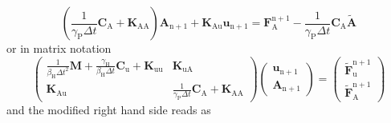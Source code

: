 \begin{equation}
\left(\frac{1}{\gamma_\mathrm{P} \Delta t} \mathbf{C}_\mathrm{A} +  \mathbf{K}_\mathrm{AA}\right) \mathbf{A}_{\mathrm{n}+1} 
+ \mathbf{K}_\mathrm{Au} \mathbf{u}_{\mathrm{n} + 1} = 
 \mathbf{F}_{\mathrm{A}}^{\mathrm{n}+1} - \frac{1}{\gamma_\mathrm{P} \Delta t} \mathbf{C}_\mathrm{A} \mathbf{\tilde{A}}
\end{equation}
or in matrix notation
\begin{equation}
\left( \begin{array}{cc} \frac{1}{\beta_\mathrm{H} \Delta t^2} \mathbf{M} + \frac{\gamma_\mathrm{H}}{\beta_\mathrm{H} \Delta t} \mathbf{C}_\mathrm{u}
+ \mathbf{K}_\mathrm{uu} & \mathbf{K}_\mathrm{uA} \\
\mathbf{K}_\mathrm{Au} & \frac{1}{\gamma_\mathrm{P} \Delta t} \mathbf{C}_\mathrm{A} +  \mathbf{K}_\mathrm{AA} \end{array} \right)
\left( \begin{array}{c} \mathbf{u}_{\mathrm{n}+1} \\ \mathbf{A}_{\mathrm{n}+1} \end{array} \right) = 
\left( \begin{array}{c} \mathbf{\tilde{F}}_{\mathrm{u}}^{\mathrm{n}+1} \\ \mathbf{\tilde{F}}_{\mathrm{A}}^{\mathrm{n}+1} \end{array} \right)
\end{equation}
and the modified right hand side reads as

